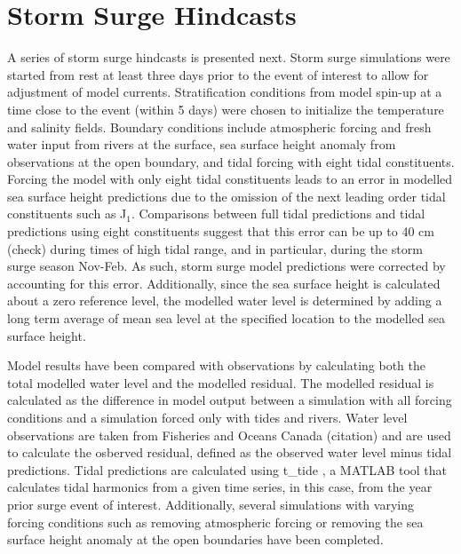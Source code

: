 \documentclass[pdftex,10pt]{article}
\begin{document}
\section{Storm Surge Hindcasts}\label{sec:storm}
A series of storm surge hindcasts is presented next. Storm surge simulations were started from rest at least three days prior to the event of interest to allow for adjustment of model currents. Stratification conditions from model spin-up at a time close to the event (within 5 days) were chosen to initialize the temperature and salinity fields. Boundary conditions include atmospheric forcing and fresh water input from rivers at the surface, sea surface height anomaly from observations at the open boundary, and tidal forcing with eight tidal constituents. Forcing the model with only eight tidal constituents leads to an error in modelled sea surface height predictions due to the omission of the next leading order tidal constituents such as J$_1$. Comparisons between full tidal predictions and tidal predictions using eight constituents suggest that this error can be up to 40 cm (check) during times of high tidal range, and in particular, during the storm surge season Nov-Feb. As such, storm surge model predictions were corrected by accounting for this error. Additionally, since the sea surface height is calculated about a zero reference level, the modelled water level is determined by adding a long term average of mean sea level at the specified location to the modelled sea surface height.

Model results have been compared with observations by calculating both the total modelled water level and the modelled residual. The modelled residual is calculated as the difference in model output between a simulation with all forcing conditions and a simulation forced only with tides and rivers. Water level observations are taken from Fisheries and Oceans Canada (citation) and are used to calculate the osberved residual, defined as the observed water level minus tidal predictions. Tidal predictions are calculated using t\_tide \citep{pawlowicz2002classical}, a MATLAB tool that calculates tidal harmonics from a given time series, in this case, from the year prior surge event of interest. Additionally, several simulations with varying forcing conditions such as removing atmospheric forcing or removing the sea surface height anomaly at the open boundaries have been completed. 
\end{document}

